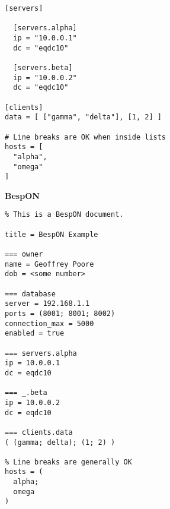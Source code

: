 \documentclass[11pt]{article}
\begin{document}
\begin{appendices}
\begin{tcolorbox}{}
\begin{multicols}{2}
\begin{Verbatim}[formatcom=\color{DarkGreen}]
[servers]

  [servers.alpha]
  ip = "10.0.0.1"
  dc = "eqdc10"

  [servers.beta]
  ip = "10.0.0.2"
  dc = "eqdc10"

[clients]
data = [ ["gamma", "delta"], [1, 2] ]

# Line breaks are OK when inside lists
hosts = [
  "alpha",
  "omega"
]
\end{Verbatim}
\columnbreak
\centering \textbf{BespON}

\begin{Verbatim}
% This is a BespON document.

title = BespON Example

=== owner
name = Geoffrey Poore
dob = <some number>

=== database
server = 192.168.1.1
ports = (8001; 8001; 8002)
connection_max = 5000
enabled = true

=== servers.alpha
ip = 10.0.0.1
dc = eqdc10

=== _.beta
ip = 10.0.0.2
dc = eqdc10

=== clients.data
( (gamma; delta); (1; 2) )

% Line breaks are generally OK
hosts = (
  alpha;
  omega
)
\end{Verbatim}
\end{multicols}
\end{tcolorbox}



\end{appendices}
\end{document}

